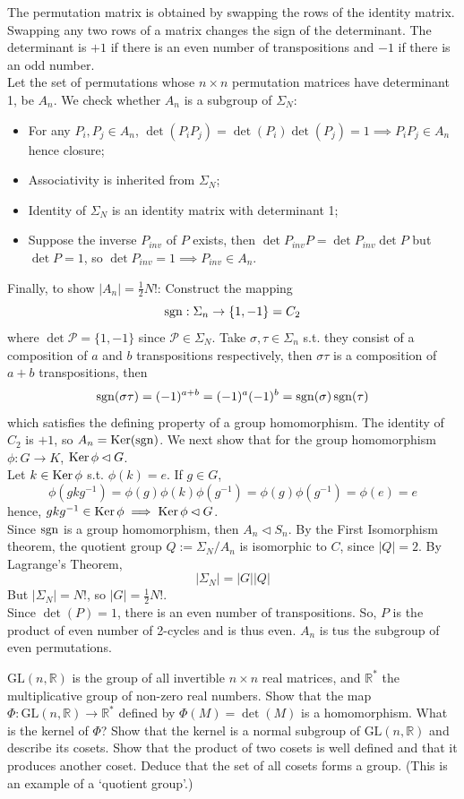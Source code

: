 \documentclass[a4paper]{article}
\begin{document}
\begin{ans}
The permutation matrix is obtained by swapping the rows of the identity matrix. Swapping any two rows of a matrix changes the sign of the determinant. The determinant is $+1$ if there is an even number of transpositions and $-1$ if there is an odd number.\\[5pt]
Let the set of permutations whose $n\times n$ permutation matrices have determinant 1, be $A_n$. We check whether $A_n$ is a subgroup of $\Sigma_N$:
\begin{itemize}
    \item For any $P_i,P_j\in A_n$, $\det(P_iP_j)=\det(P_i)\det(P_j)=1\implies P_iP_j\in A_n$ hence closure;
    \item Associativity is inherited from $\Sigma_N$;
    \item Identity of $\Sigma_N$ is an identity matrix with determinant 1;
    \item Suppose the inverse $P_{inv}$ of $P$ exists, then $\det P_{inv}P=\det P_{inv}\det P$ but $\det P=1$, so $\det P_{inv}=1\implies P_{inv}\in A_n$.
\end{itemize}
Finally, to show $|A_n|=\frac{1}{2}N!$: Construct the mapping
$$\operatorname{sgn}: \Sigma_n\rightarrow\{1,-1\}=C_2$$
where $\det\mathcal{P}=\{1,-1\}$ since $\mathcal{P}\in\Sigma_N$. Take $\sigma,\tau\in\Sigma_n$ s.t. they consist of a composition of $a$ and $b$ transpositions respectively, then $\sigma\tau$ is a composition of $a+b$ transpositions, then
$$\operatorname{sgn}(\sigma\tau)=(-1)^{a+b}=(-1)^a(-1)^b=\operatorname{sgn}(\sigma)\operatorname{sgn}(\tau)$$
which satisfies the defining property of a group homomorphism. The identity of $C_2$ is $+1$, so $A_n=\operatorname{Ker}(\operatorname{sgn})$. We next show that for the group homomorphism $\phi: G\rightarrow K$, $\operatorname{Ker}\phi\lhd G$.\\[5pt]
Let $k\in\operatorname{Ker}\phi$ s.t. $\phi(k)=e$. If $g\in G$,
$$\phi(gkg^{-1})=\phi(g)\phi(k)\phi(g^{-1})=\phi(g)\phi(g^{-1})=\phi(e)=e$$
hence, $gkg^{-1}\in\operatorname{Ker}\phi\implies\operatorname{Ker}\phi\lhd G$.\\[5pt]
Since $\operatorname{sgn}$ is a group homomorphism, then $A_n\lhd S_n$. By the First Isomorphism theorem, the quotient group $Q:=\Sigma_N/A_n$ is isomorphic to $C$, since $|Q|=2$. By Lagrange's Theorem, $$|\Sigma_N|=|G||Q|$$ But $|\Sigma_N|=N!$, so $|G|=\frac{1}{2}N!$.\\[5pt]
Since $\det(P)=1$, there is an even number of transpositions. So, $P$ is the product of even number of 2-cycles and is thus even. $A_n$ is tus the subgroup of even permutations.
\end{ans}
\newpage
\begin{qns}
$\text{GL}(n,\mathbb{R})$ is the group of all invertible $n\times n$ real matrices, and $\mathbb{R}^*$ the multiplicative group of non-zero real numbers. Show that the map $\Phi:\text{GL}(n,\mathbb{R})\rightarrow\mathbb{R}^*$ defined by $\Phi(M)=\det(M)$ is a homomorphism. What is the kernel of $\Phi$? Show that the kernel is a normal subgroup of $\text{GL}(n,\mathbb{R})$ and describe its cosets. Show that the product of two cosets is well defined and that it produces another coset. Deduce that the set of all cosets forms a group. (This is an example of a ‘quotient group’.)
\end{qns}
\end{document}
